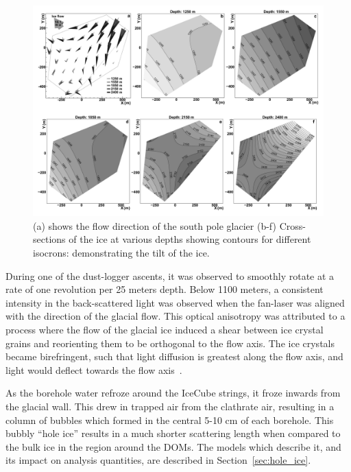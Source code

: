 \documentclass[main.tex]{subfiles}
\begin{document}
\begin{figure}  
    \centering
    \includegraphics[width=0.8\linewidth]{figures/icecube_isochron.png}
    \caption{(a) shows the flow direction of the south pole glacier (b-f) Cross-sections of the ice at various depths showing contours for different isocrons: demonstrating the tilt of the ice.}\label{fig:isochron}
\end{figure}

During one of the dust-logger ascents, it was observed to smoothly rotate at a rate of one revolution per 25 meters depth. 
Below 1100 meters, a consistent intensity in the back-scattered light was observed when the fan-laser was aligned with the direction of the glacial flow. 
This optical anisotropy was attributed to a process where the flow of the glacial ice induced a shear between ice crystal grains and reorienting them to be orthogonal to the flow axis. 
The ice crystals became birefringent, such that light diffusion is greatest along the flow axis, and light would deflect towards the flow axis~\cite{ice_anisotropy, ice_birefringence}.

As the borehole water refroze around the IceCube strings, it froze inwards from the glacial wall. 
This drew in trapped air from the clathrate air, resulting in a column of bubbles which formed in the central 5-10 cm of each borehole.
This bubbly ``hole ice'' results in a much shorter scattering length when compared to the bulk ice in the region around the DOMs. 
The models which describe it, and its impact on analysis quantities, are described in Section~\ref{sec:hole_ice}. 
\end{document}
